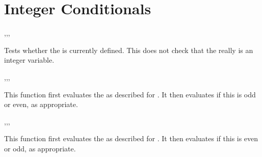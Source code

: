 \documentclass[oneside]{book}
\begin{document}
\section{Integer Conditionals}

\begin{function}{\intIfExist,\intIfExistT,\intIfExistF,\intIfExistTF}
\begin{syntax}
 
  
  
   
\end{syntax}
Tests whether the  is currently defined.  This does not
check that the  really is an integer variable.
\end{function}

\begin{function}{\intIfOdd,\intIfOddT,\intIfOddF,\intIfOddTF}
\begin{syntax}
 
  
  
   
\end{syntax}
This function first evaluates the 
as described for .
It then evaluates if this is odd or even, as appropriate.
\end{function}

\begin{function}{\intIfEven,\intIfEvenT,\intIfEvenF,\intIfEvenTF}
\begin{syntax}
 
  
  
   
\end{syntax}
This function first evaluates the 
as described for .
It then evaluates if this is even or odd, as appropriate.
\end{function}
\end{document}
